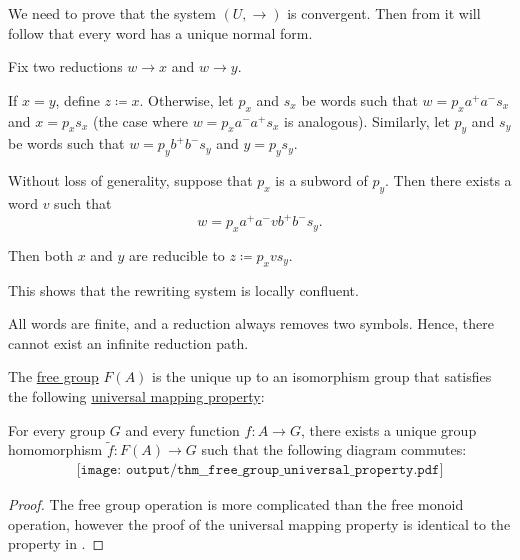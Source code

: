 \begin{defproof}
  We need to prove that the system \( (U, \to) \) is convergent. Then from  it will follow that every word has a unique normal form.

   Fix two reductions \( w \to x \) and \( w \to y \).

  If \( x = y \), define \( z \coloneqq x \). Otherwise, let \( p_x \) and \( s_x \) be words such that \( w = p_x a^+ a^- s_x \) and \( x = p_x s_x \) (the case where \( w = p_x a^- a^+ s_x \) is analogous). Similarly, let \( p_y \) and \( s_y \) be words such that \( w = p_y b^+ b^- s_y \) and \( y = p_y s_y \).

  Without loss of generality, suppose that \( p_x \) is a subword of \( p_y \). Then there exists a word \( v \) such that
  \begin{equation*}
    w = p_x a^+ a^- v b^+ b^- s_y.
  \end{equation*}

  Then both \( x \) and \( y \) are reducible to \( z \coloneqq p_x v s_y \).

  This shows that the rewriting system is locally confluent.

   All words are finite, and a reduction always removes two symbols. Hence, there cannot exist an infinite reduction path.
\end{defproof}

\begin{proposition}\label{thm:free_group_universal_property}
  The \hyperref[def:free_group]{free group} \( F(A) \) is the unique up to an isomorphism group that satisfies the following \hyperref[rem:universal_mapping_property]{universal mapping property}:
  \begin{displayquote}
    For every group \( G \) and every function \( f: A \to G \), there exists a unique group homomorphism \( \widetilde{f}: F(A) \to G \) such that the following diagram commutes:
    \begin{equation}\label{eq:thm:free_group_universal_property/diagram}
      \begin{aligned}
        \texttt{[image: output/thm\_\_free\_group\_universal\_property.pdf]}
      \end{aligned}
    \end{equation}
  \end{displayquote}
\end{proposition}
\begin{proof}
  The free group operation is more complicated than the free monoid operation, however the proof of the universal mapping property is identical to the property in .
\end{proof}

